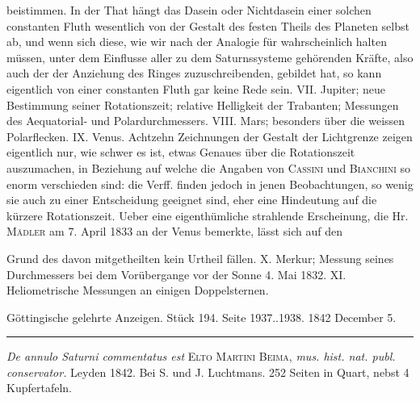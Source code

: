 beistimmen. In der That hängt das Dasein oder Nichtdasein einer solchen constanten Fluth wesentlich von der Gestalt des festen Theils des Planeten selbst ab, und wenn sich diese, wie wir nach der Analogie für wahrscheinlich halten müssen, unter dem Einflusse aller zu dem Saturnssysteme gehörenden Kräfte, also auch der der Anziehung des Ringes zuzuschreibenden, gebildet hat, so kann eigentlich von einer constanten Fluth gar keine Rede sein. VII. Jupiter; neue Bestimmung seiner Rotationszeit; relative Helligkeit der Trabanten; Messungen des Aequatorial- und Polardurchmessers. VIII. Mars; besonders über die weissen Polarflecken. IX. Venus. Achtzehn Zeichnungen der Gestalt der Lichtgrenze zeigen eigentlich nur, wie schwer es ist, etwas Genaues über die Rotationszeit auszumachen, in Beziehung auf welche die Angaben von \textsc{Cassini} und \textsc{Bianchini} so enorm verschieden sind: die Verff. finden jedoch in jenen Beobachtungen, so wenig sie auch zu einer Entscheidung geeignet sind, eher eine Hindeutung auf die kürzere Rotationszeit. Ueber eine eigenthümliche strahlende Erscheinung, die Hr. \textsc{Mädler} am 7. April 1833 an der Venus bemerkte, lässt sich auf den\par\nobreak\smallskip
{}\hfill{\normalsize\bfseries{}}\hspace*{.18\linewidth}\par
\clearpage
\thispagestyle{empty}
\noindent{}%
%
%
\makebox[12mm][r]{}\par\medskip
\noindent Grund des davon mitgetheilten kein Urtheil fällen. X. Merkur; Messung seines Durchmessers bei dem Vorübergange vor der Sonne 4. Mai 1832. XI. Heliometrische Messungen an einigen Doppelsternen.

\par\bigskip
\hypertarget{native-659-middle}{}
\begin{center}\small Göttingische gelehrte Anzeigen. Stück 194. Seite 1937..1938. 1842 December 5.\\[3pt]\rule{.72\linewidth}{.3pt}\end{center}

\emph{De annulo Saturni commentatus est} \textsc{Elto Martini Beima}, \emph{mus. hist. nat. publ. conservator.} Leyden 1842. Bei S. und J. Luchtmans. 252 Seiten in Quart, nebst 4 Kupfertafeln.

